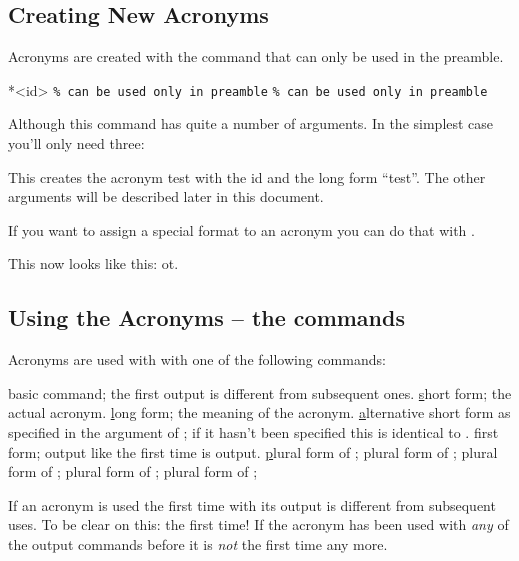 \documentclass[DIV10,toc=index,toc=bib]{cnpkgdoc}
\let\h\uline
\begin{document}
\subsection{Creating New Acronyms}
Acronyms are created with the command  that can only be used in
the preamble.
\begin{beschreibung}
 *{<id>}
 \verb+% can be used only in preamble+
  \verb+% can be used only in preamble+
\end{beschreibung}
Although this command has quite a number of arguments. In the simplest case you'll
only need three:
\begin{beispiel}
\end{beispiel}
This creates the acronym \acs{test} with the \acs{id}  and the long form
``\acl{test}''. The other arguments will be described later in this document.

If you want to assign a special format to an acronym you can do that with
.
\begin{beispiel}
\end{beispiel}
This now looks like this: \acs{ot}.

\subsection{Using the Acronyms -- the commands}
Acronyms are used with with one of the following commands:
\begin{beschreibung}
  basic command; the first output is different from subsequent ones.
  \h{s}hort form; the actual acronym.
  \h{l}ong form; the meaning of the acronym.
  \h{a}lternative short form as specified in the  argument
 of ; if it hasn't been specified this is identical to .
  first form; output like the first time  is output.
  \h{p}lural form of ;
  plural form of ;
  plural form of ;
  plural form of ;
  plural form of ;
\end{beschreibung}
If an acronym is used the first time with  its output is different from
subsequent uses. To be clear on this: the first time! If the acronym has been
used with \emph{any} of the output commands before it is \emph{not} the first
time any more.
\end{document}
